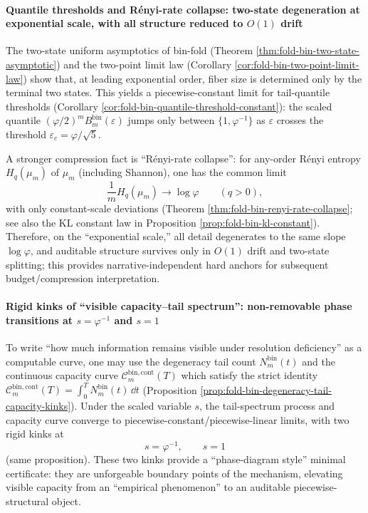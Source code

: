 \paragraph{Quantile thresholds and R\'enyi-rate collapse: two-state degeneration at exponential scale, with all structure reduced to \texorpdfstring{$O(1)$}{O(1)} drift}
The two-state uniform asymptotics of bin-fold (Theorem \ref{thm:fold-bin-two-state-asymptotic}) and the two-point limit law (Corollary \ref{cor:fold-bin-two-point-limit-law}) show that, at leading exponential order, fiber size is determined only by the terminal two states.
This yields a piecewise-constant limit for tail-quantile thresholds (Corollary \ref{cor:fold-bin-quantile-threshold-constant}): the scaled quantile
\(
(\varphi/2)^m B^{\mathrm{bin}}_m(\varepsilon)
\)
jumps only between \(\{1,\varphi^{-1}\}\) as \(\varepsilon\) crosses the threshold \(\varepsilon_c=\varphi/\sqrt5\).
\par
A stronger compression fact is ``R\'enyi-rate collapse'': for any-order R\'enyi entropy \(H_q(\mu_m)\) of \(\mu_m\) (including Shannon), one has the common limit
\[
\frac{1}{m}H_q(\mu_m)\to\log\varphi
\qquad(q>0),
\]
with only constant-scale deviations (Theorem \ref{thm:fold-bin-renyi-rate-collapse}; see also the KL constant law in Proposition \ref{prop:fold-bin-kl-constant}).
Therefore, on the ``exponential scale,'' all detail degenerates to the same slope \(\log\varphi\), and auditable structure survives only in \(O(1)\) drift and two-state splitting; this provides narrative-independent hard anchors for subsequent budget/compression interpretation.

\paragraph{Rigid kinks of ``visible capacity--tail spectrum'': non-removable phase transitions at \texorpdfstring{$s=\varphi^{-1}$}{s=phi^{-1}} and \texorpdfstring{$s=1$}{s=1}}
To write ``how much information remains visible under resolution deficiency'' as a computable curve, one may use the degeneracy tail count
\(
N^{\mathrm{bin}}_m(t)
\)
and the continuous capacity curve
\(
\mathcal{C}^{\mathrm{bin,cont}}_m(T)
\)
which satisfy the strict identity
\(
\mathcal{C}^{\mathrm{bin,cont}}_m(T)=\int_0^T N^{\mathrm{bin}}_m(t)\,\dd t
\)
(Proposition \ref{prop:fold-bin-degeneracy-tail-capacity-kinks}).
Under the scaled variable \(s\), the tail-spectrum process and capacity curve converge to piecewise-constant/piecewise-linear limits, with two rigid kinks at
\[
s=\varphi^{-1},\qquad s=1
\]
(same proposition).
These two kinks provide a ``phase-diagram style'' minimal certificate: they are unforgeable boundary points of the mechanism, elevating visible capacity from an ``empirical phenomenon'' to an auditable piecewise-structural object.

